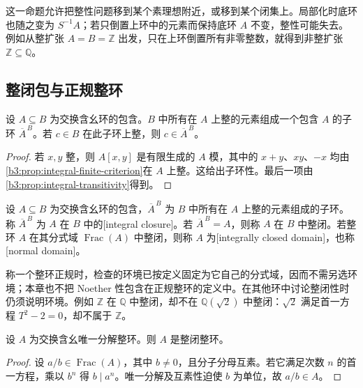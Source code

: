 这一命题允许把整性问题移到某个素理想附近，或移到某个闭集上。局部化时底环也随之变为 \(S^{-1}A\)；若只倒置上环中的元素而保持底环 \(A\) 不变，整性可能失去。例如从整扩张 \(A=B=\mathbb Z\) 出发，只在上环倒置所有非零整数，就得到非整扩张 \(\mathbb Z\subseteq\mathbb Q\)。

\subsection{整闭包与正规整环}\label{b3:subsec:0501:03}

\begin{proposition}\label{b3:prop:integral-closure-ring}
	设 \(A\subseteq B\) 为交换含幺环的包含。\(B\) 中所有在 \(A\) 上整的元素组成一个包含 \(A\) 的子环 \(\overline A^{\,B}\)。若 \(c\in B\) 在此子环上整，则 \(c\in\overline A^{\,B}\)。
\end{proposition}
\begin{proof}
	若 \(x,y\) 整，则 \(A[x,y]\) 是有限生成的 \(A\) 模，其中的 \(x+y\)、\(xy\)、\(-x\) 均由\cref{b3:prop:integral-finite-criterion}在 \(A\) 上整。这给出子环性。最后一项由\cref{b3:prop:integral-transitivity}得到。
\end{proof}

\begin{definition}\label{b3:def:integral-closure}
	设 \(A\subseteq B\) 为交换含幺环的包含，\(\overline A^{\,B}\) 为 \(B\) 中所有在 \(A\) 上整的元素组成的子环。称 \(\overline A^{\,B}\) 为 \(A\) 在 \(B\) 中的[integral closure]。若 \(\overline A^{\,B}=A\)，则称 \(A\) 在 \(B\) 中整闭。若整环 \(A\) 在其分式域 \(\operatorname{Frac}(A)\) 中整闭，则称 \(A\) 为[integrally closed domain]，也称[normal domain]。
\end{definition}

称一个整环正规时，检查的环境已按定义固定为它自己的分式域，因而不需另选环境；本章也不把 Noether 性包含在正规整环的定义中。在其他环中讨论整闭性时仍须说明环境。例如 \(\mathbb Z\) 在 \(\mathbb Q\) 中整闭，却不在 \(\mathbb Q(\sqrt2)\) 中整闭：\(\sqrt2\) 满足首一方程 \(T^2-2=0\)，却不属于 \(\mathbb Z\)。

\begin{proposition}\label{b3:prop:ufd-integrally-closed}
	设 \(A\) 为交换含幺唯一分解整环。则 \(A\) 是整闭整环。
\end{proposition}
\begin{proof}
	设 \(a/b\in\operatorname{Frac}(A)\)，其中 \(b\ne0\)，且分子分母互素。若它满足次数 \(n\) 的首一方程，乘以 \(b^n\) 得 \(b\mid a^n\)。唯一分解及互素性迫使 \(b\) 为单位，故 \(a/b\in A\)。
\end{proof}

